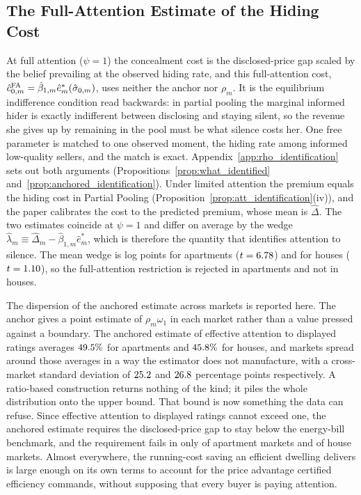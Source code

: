 \subsection*{The Full-Attention Estimate of the Hiding Cost}
\label{app:c0_fullattention}

At full attention ($\psi=1$) the concealment cost is the disclosed-price gap scaled by the belief prevailing at the observed hiding rate, and this full-attention cost, $\hat c_{0,m}^{\rm FA}=\hat\beta_{1,m}\hat e^*_m(\hat\sigma_{0,m})$, uses neither the anchor nor $\rho_m$. It is the equilibrium indifference condition read backwards: in partial pooling the marginal informed hider is exactly indifferent between disclosing and staying silent, so the revenue she gives up by remaining in the pool must be what silence costs her. One free parameter is matched to one observed moment, the hiding rate among informed low-quality sellers, and the match is exact. Appendix~\ref{app:rho_identification} sets out both arguments (Propositions~\ref{prop:what_identified} and~\ref{prop:anchored_identification}). Under limited attention the premium equals the hiding cost in Partial Pooling (Proposition~\ref{prop:att_identification}(iv)), and the paper calibrates the cost to the predicted premium, whose mean is $\hat\Delta$. The two estimates coincide at $\psi=1$ and differ on average by the wedge $\hat\lambda_m\equiv\hat\Delta_m-\hat\beta_{1,m}\hat e^*_m$, which is therefore the quantity that identifies attention to silence. The mean wedge is \attLamApt{} log points for apartments ($t=6.78$) and \attLamHouse{} for houses ($t=1.10$), so the full-attention restriction is rejected in apartments and not in houses.

The dispersion of the anchored estimate across markets is reported here. The anchor gives a point estimate of $\rho_m\omega_1$ in each market rather than
a value pressed against a boundary. The anchored estimate of effective attention to displayed
ratings averages $49.5{}\%$ for apartments and $45.8{}\%$ for houses, and markets
spread around those averages in a way the estimator does not manufacture, with a cross-market
standard deviation of $25.2{}$ and $26.8{}$ percentage points respectively. A ratio-based construction returns nothing
of the kind; it piles the whole distribution onto the upper bound. That bound is now something
the data can refuse. Since effective attention to displayed ratings cannot exceed one, the anchored estimate requires
the disclosed-price gap to stay below the energy-bill benchmark, and the requirement fails in
only \attNRhoGtOneApt{} of \attNMarketsApt{} apartment markets and \attNRhoGtOneHouse{} of \attNMarketsHouse{} house markets. Almost everywhere, the running-cost
saving an efficient dwelling delivers is large enough on its own terms to account for the price
advantage certified efficiency commands, without supposing that every buyer is paying attention.


